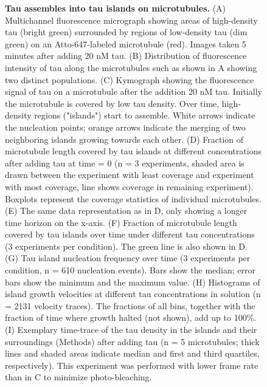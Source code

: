 \begin{figure}[t!]
\caption[Tau assembles into tau islands on microtubules.]{\textbf{Tau assembles into tau islands on microtubules.} (A) Multichannel fluorescence micrograph showing areas of high-density tau (bright green) surrounded by regions of low-density tau (dim green) on an Atto-647-labeled microtubule (red). Images taken 5 minutes after adding 20 nM tau. (B) Distribution of fluorescence intensity of tau along the microtubules such as shown in A showing two distinct populations. (C) Kymograph showing the fluorescence signal of tau on a microtubule after the addition 20 nM tau. Initially the microtubule is covered by low tau density. Over time, high-density regions ("islands") start to assemble. White arrows indicate the nucleation points; orange arrows indicate the merging of two neighboring islands growing towards each other. (D) Fraction of microtubule length covered by tau islands at different concentrations after adding tau at time = 0 (n = 3 experiments, shaded area is drawn between the experiment with least coverage and experiment with most coverage, line shows coverage in remaining experiment). Boxplots represent the coverage statistics of individual microtubules. (E) The same data representation as in D, only showing a longer time horizon on the x-axis. (F) Fraction of microtubule length covered by tau islands over time under different tau concentrations (3 experiments per condition). The green line is also shown in D. (G) Tau island nucleation frequency over time (3 experiments per condition, n = 610 nucleation events). Bars show the median; error bars show the minimum and the maximum value. (H) Histograms of island growth velocities at different tau concentrations in solution (n = 2131 velocity traces). The fractions of all bins, together with the fraction of time where growth halted (not shown), add up to 100\%. (I) Exemplary time-trace of the tau density in the islands and their surroundings (Methods) after adding tau (n = 5 microtubules; thick lines and shaded areas indicate median and first and third quartiles, respectively). This experiment was performed with lower frame rate than in C to minimize photo-bleaching.
	}\label{tauGROW}
\end{figure}

